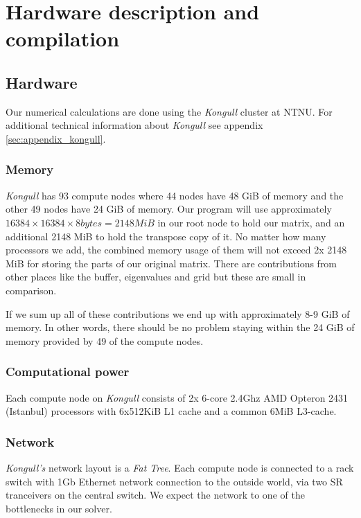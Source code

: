 
\clearpage
\section{Hardware description and compilation} %
\label{sec:hardware_and_compilation}

\subsection{Hardware} %
\label{sub:hardware}
Our numerical calculations are done using the \emph{Kongull} cluster at NTNU. For additional technical information about \emph{Kongull} see appendix \ref{sec:appendix_kongull}.

\subsubsection{Memory} %
\label{ssub:memory}
\emph{Kongull} has 93 compute nodes where 44 nodes have 48 GiB of memory and the other 49 nodes have 24 GiB of memory. Our program will use approximately $16384 \times 16384 \times 8 bytes = 2148 MiB$ in our root node to hold our matrix, and an additional 2148 MiB to hold the transpose copy of it. No matter how many processors we add, the combined memory usage of them will not exceed 2x 2148 MiB for storing the parts of our original matrix. There are contributions from other places like the buffer, eigenvalues and grid but these are small in comparison.

If we sum up all of these contributions we end up with approximately 8-9 GiB of memory. In other words, there should be no problem staying within the 24 GiB of memory provided by 49 of the compute nodes.

\subsubsection{Computational power} %
\label{ssub:subsubsection_name}
Each compute node on \emph{Kongull} consists of 2x 6-core 2.4Ghz AMD Opteron 2431 (Istanbul) processors with 6x512KiB L1 cache and a common 6MiB L3-cache.

\subsubsection{Network} %
\label{ssub:network}
\emph{Kongull's} network layout is a \emph{Fat Tree}. Each compute node is connected to a rack switch with 1Gb Ethernet network connection to the outside world, via two SR tranceivers on the central switch. We expect the network to one of the bottlenecks in our solver.

